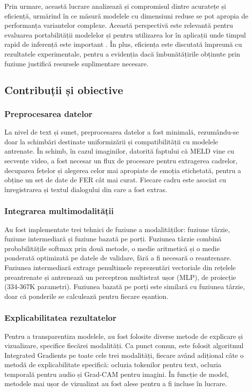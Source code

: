 \documentclass[12pt, a4paper]{article}
\begin{document}
Prin urmare, această lucrare analizează și compromisul dintre acuratețe și eficiență, urmărind în ce măsură modelele cu dimensiuni reduse se pot apropia de performanța variantelor complexe. Această perspectivă este relevantă pentru evaluarea portabilității modelelor și pentru utilizarea lor în aplicații unde timpul rapid de inferență este important \cite{chen2019deep}. În plus, eficiența este discutată împreună cu rezultatele experimentale, pentru a evidenția dacă îmbunătățirile obținute prin fuziune justifică resursele suplimentare necesare.


\subsection{Contribuții și obiective}

\subsubsection{Preprocesarea datelor}
La nivel de text și sunet, preprocesarea datelor a fost minimală, rezumându-se doar la schimbări destinate uniformizării și compatibilității cu modelele antrenate. În schimb, în cazul imaginilor, datorită faptului că MELD vine cu secvențe video, a fost necesar un flux de procesare pentru extragerea cadrelor, decuparea fețelor și alegerea celor mai apropiate de emoția etichetată, pentru a obține un set de date de FER cât mai curat. Fiecare cadru este asociat cu înregistrarea și textul dialogului din care a fost extras.

\subsubsection{Integrarea multimodalității}
Au fost implementate trei tehnici de fuziune a modalităților: fuziune târzie, fuziune intermediară și fuziune bazată pe porți. Fuziunea târzie combină probabilitățile softmax prin două metode, o medie aritmetică și o medie ponderată optimizată pe datele de validare, fără a fi necesară o reantrenare. Fuziunea intermediară extrage penultimele reprezentări vectoriale din rețelele preantrenate și antrenează un perceptron multistrat ușor (MLP), de proiecție (334-367K parametri). Fuziunea bazată pe porți este similară cu fuziunea târzie, doar că ponderile se calculează pentru fiecare eșantion.

\subsubsection{Explicabilitatea rezultatelor}
Pentru a transparentiza modelele, au fost folosite diverse metode de explicare și vizualizare, specifice fiecărei modalități. Ca punct comun, este folosit algoritmul Integrated Gradients \cite{sundararajan2017axiomatic} pe toate cele trei modalități, fiecare având adițional câte o metodă de explicabilitate specifică: ocluzia tokenilor pentru text, ocluzia temporală pentru audio \cite{ivanovs2021perturbation} și Grad-CAM \cite{selvaraju2017gradcam} pentru imagini. În funcție de model, metodele mai ușor de vizualizat au fost alese pentru a fi incluse în lucrare.
\end{document}
